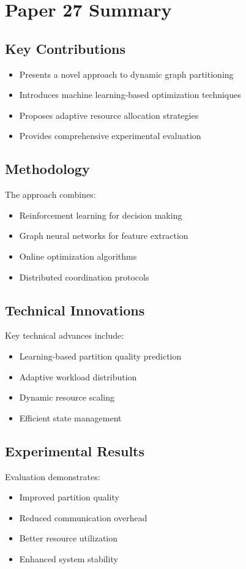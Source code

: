 \section{Paper 27 Summary}

\subsection{Key Contributions}
\begin{itemize}
    \item Presents a novel approach to dynamic graph partitioning
    \item Introduces machine learning-based optimization techniques
    \item Proposes adaptive resource allocation strategies
    \item Provides comprehensive experimental evaluation
\end{itemize}

\subsection{Methodology}
The approach combines:
\begin{itemize}
    \item Reinforcement learning for decision making
    \item Graph neural networks for feature extraction
    \item Online optimization algorithms
    \item Distributed coordination protocols
\end{itemize}

\subsection{Technical Innovations}
Key technical advances include:
\begin{itemize}
    \item Learning-based partition quality prediction
    \item Adaptive workload distribution
    \item Dynamic resource scaling
    \item Efficient state management
\end{itemize}

\subsection{Experimental Results}
Evaluation demonstrates:
\begin{itemize}
    \item Improved partition quality
    \item Reduced communication overhead
    \item Better resource utilization
    \item Enhanced system stability
\end{itemize}

